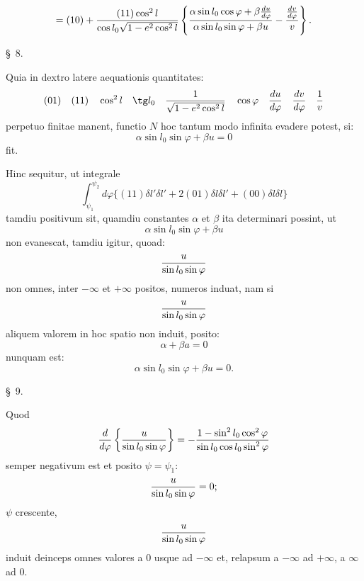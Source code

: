 \[
=(10)+{(11)\cos^2l\over \cos l_0\sqrt{1-e^2\cos^2l}}
\left\{{\alpha\sin l_0\cos\varphi+\beta{du\over d\varphi}
\over \alpha\sin l_0\sin\varphi+\beta u}
-{ {dv\over d\varphi}\over v}\right\}.
\]

\begin{center}\S\ 8.\end{center}

Quia in dextro latere aequationis quantitates:
\[
 (01)\quad (11)\quad \cos^2l\quad \tg l_0\quad {1\over \sqrt{1-e^2\cos^2l}}\quad
 \cos\varphi\quad {du\over d\varphi}\quad {dv\over d\varphi}\quad {1\over v}
\]
perpetuo finitae manent, functio $N$ hoc tantum modo infinita evadere potest, si:
\[
 \alpha\sin l_0\sin\varphi+\beta u=0
\]
fit.

Hinc sequitur, ut integrale
\[
 \int_{\psi_1}^{\psi_2}d\varphi\{(11)\delta l'\delta l'+2(01)\delta l\delta l'+(00)\delta l\delta l\}
\]
tamdiu positivum sit, quamdiu constantes $\alpha$ et $\beta$ ita determinari possint, ut
\[
 \alpha\sin l_0\sin\varphi+\beta u
\]
non evanescat, tamdiu igitur, quoad:
\[
 {u\over \sin l_0\sin\varphi}
\]
non omnes, inter $-\infty$ et $+\infty$ positos, numeros induat, nam si
\[
 {u\over \sin l_0\sin\varphi}
\]
aliquem valorem  in hoc spatio non induit, posito:
\[
 \alpha+\beta a=0
\]
nunquam est:
\[
 \alpha\sin l_0\sin\varphi+\beta u=0.
\]

\begin{center}\S\ 9.\end{center}

Quod
\[
 {d\over d\varphi}\left\{ {u\over \sin l_0\sin\varphi}\right\}
 =-{1-\sin^2l_0\cos^2\varphi\over \sin l_0\cos l_0\sin^2\varphi}
\]
semper negativum est et posito $\psi=\psi_1$:
\[
 {u\over \sin l_0\sin\varphi}=0;
\]
$\psi$ crescente,
\[
 {u\over \sin l_0\sin\varphi}
\]
induit deinceps omnes valores a $0$ usque ad $-\infty$ et, relapsum a $-\infty$ ad $+\infty$, a $\infty$ ad $0$.
